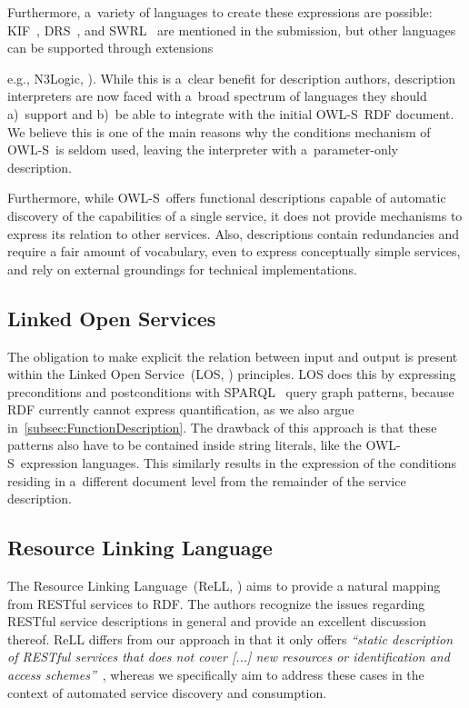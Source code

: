 \documentclass[smallextended]{svjour3}
\newcommand{\owls}{\mbox{OWL-S}}
\begin{document}
Furthermore, a~variety of languages to create these expressions are possible: KIF~\cite{KIF}, DRS~\cite{DRS}, and SWRL~\cite{SWRL} are mentioned in the submission, but other languages can be supported through extensions {e.g., N3Logic, \cite{N3Logic}).
While this is a~clear benefit for description authors, description interpreters are now faced with a~broad spectrum of languages they should a)~support and b)~be able to integrate with the initial \owls\ RDF document.
We believe this is one of the main reasons why the conditions mechanism of \owls\ is seldom used, leaving the interpreter with a~parameter-only description.

Furthermore, while \owls\ offers functional descriptions capable of automatic discovery of the capabilities of a single service, it does not provide mechanisms to express its relation to other services. Also, descriptions contain redundancies and require a fair amount of vocabulary, even to express conceptually simple services, and rely on external groundings for technical implementations.

\subsection{Linked Open Services}
The obligation to make explicit the relation between input and output is present within the Linked Open Service~(LOS, \cite{Krummenacher:2010p5107}) principles.
LOS does this by expressing preconditions and postconditions with SPARQL~\cite{SparqlQuery} query graph patterns, because RDF currently cannot express quantification, as we also argue in~\autoref{subsec:FunctionDescription}.
The drawback of this approach is that these patterns also have to be contained inside string literals, like the \owls\ expression languages.
This similarly results in the expression of the conditions residing in a~different document level from the remainder of the service description.

\subsection{Resource Linking Language}
The Resource Linking Language~(ReLL, \cite{Alarcon:2010p5515}) aims to provide a natural mapping from RESTful services to RDF. The authors recognize the issues regarding RESTful service descriptions in general and provide an excellent discussion thereof. ReLL differs from our approach in that it only offers \emph{``static description of RESTful services that does not cover [...] new resources or identification and access schemes''}~\cite{Alarcon:2010p5515}, whereas we specifically aim to address these cases in the context of automated service discovery and consumption.

}
\end{document}
